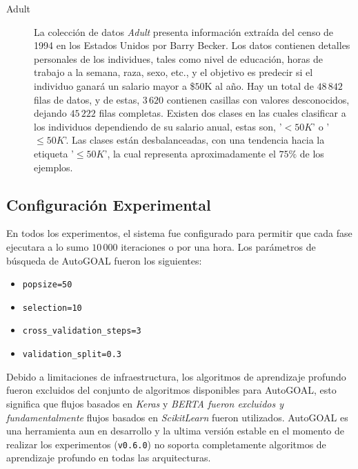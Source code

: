 \begin{description}
\item[Adult]
La colección de datos \emph{Adult} \parencite{ucidata} presenta información extraída del censo de 1994 en los Estados Unidos por Barry Becker.
Los datos contienen detalles personales de los individues, tales como nivel de educación, horas de trabajo a la semana, raza, sexo, etc., y el objetivo es predecir si el individuo ganará un salario mayor a \$$50$K al año.
Hay un total de $48\,842$ filas de datos, y de estas, $3\,620$ contienen casillas con valores desconocidos, dejando $45\,222$ filas completas.
Existen dos clases en las cuales clasificar a los individuos dependiendo de su salario anual, estas son, '$<50K$' o '$\leq50K$'.
Las clases están desbalanceadas, con una tendencia hacia la etiqueta '$\leq50K$', la cual representa aproximadamente el $75\%$ de los ejemplos.

\end{description}

\subsection{Configuración Experimental}\label{section:experimental-setup}

En todos los experimentos, el sistema fue configurado para permitir que cada fase ejecutara a lo sumo $10\,000$ iteraciones o por una hora.
Los parámetros de búsqueda de AutoGOAL fueron los siguientes:
\begin{itemize}
    \item \texttt{popsize=50}
    \item \texttt{selection=10}
    \item \texttt{cross\_validation\_steps=3}
    \item \texttt{validation\_split=0.3}
\end{itemize}

Debido a limitaciones de infraestructura, los algoritmos de aprendizaje profundo fueron excluidos del conjunto de algoritmos disponibles para AutoGOAL, esto significa que flujos basados en \emph{Keras} y \emph{BERTA fueron excluidos y fundamentalmente} flujos basados en \emph{ScikitLearn} fueron utilizados.
AutoGOAL es una herramienta aun en desarrollo y la ultima versión estable en el momento de realizar los experimentos (\texttt{v0.6.0}) no soporta completamente algoritmos de aprendizaje profundo en todas las arquitecturas.

